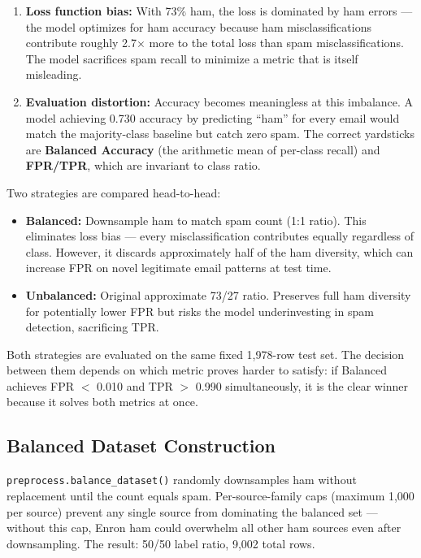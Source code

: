 \begin{enumerate}
  \item \textbf{Loss function bias:} With 73\% ham, the loss is dominated by ham errors — the model optimizes for ham accuracy because ham misclassifications contribute roughly 2.7$\times$ more to the total loss than spam misclassifications. The model sacrifices spam recall to minimize a metric that is itself misleading.
  \item \textbf{Evaluation distortion:} Accuracy becomes meaningless at this imbalance. A model achieving 0.730 accuracy by predicting ``ham'' for every email would match the majority-class baseline but catch zero spam. The correct yardsticks are \textbf{Balanced Accuracy} (the arithmetic mean of per-class recall) and \textbf{FPR/TPR}, which are invariant to class ratio.
\end{enumerate}

Two strategies are compared head-to-head:

\begin{itemize}
  \item \textbf{Balanced:} Downsample ham to match spam count (1:1 ratio). This eliminates loss bias — every misclassification contributes equally regardless of class. However, it discards approximately half of the ham diversity, which can increase FPR on novel legitimate email patterns at test time.
  \item \textbf{Unbalanced:} Original approximate 73/27 ratio. Preserves full ham diversity for potentially lower FPR but risks the model underinvesting in spam detection, sacrificing TPR.
\end{itemize}

Both strategies are evaluated on the same fixed 1,978-row test set. The decision between them depends on which metric proves harder to satisfy: if Balanced achieves FPR $<$ 0.010 and TPR $>$ 0.990 simultaneously, it is the clear winner because it solves both metrics at once.

\subsection{Balanced Dataset Construction}

\texttt{preprocess.balance\_dataset()} randomly downsamples ham without replacement until the count equals spam. Per-source-family caps (maximum 1,000 per source) prevent any single source from dominating the balanced set — without this cap, Enron ham could overwhelm all other ham sources even after downsampling. The result: 50/50 label ratio, 9,002 total rows.


